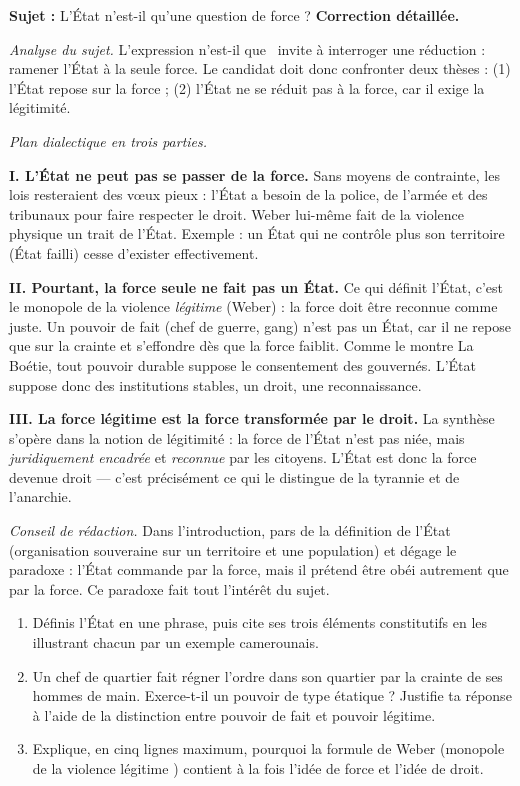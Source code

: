 \documentclass[11pt]{article}
\begin{document}
\begin{exoresolu}
\textbf{Sujet :} L'État n'est-il qu'une question de force ?
\tcblower
\textbf{Correction détaillée.}

\emph{Analyse du sujet.} L'expression \guillemotleft n'est-il que \guillemotright\ invite à interroger une réduction : ramener l'État à la seule force. Le candidat doit donc confronter deux thèses : (1) l'État repose sur la force ; (2) l'État ne se réduit pas à la force, car il exige la légitimité.

\emph{Plan dialectique en trois parties.}

\textbf{I. L'État ne peut pas se passer de la force.} Sans moyens de contrainte, les lois resteraient des vœux pieux : l'État a besoin de la police, de l'armée et des tribunaux pour faire respecter le droit. Weber lui-même fait de la violence physique un trait de l'État. Exemple : un État qui ne contrôle plus son territoire (État failli) cesse d'exister effectivement.

\textbf{II. Pourtant, la force seule ne fait pas un État.} Ce qui définit l'État, c'est le monopole de la violence \emph{légitime} (Weber) : la force doit être reconnue comme juste. Un pouvoir de fait (chef de guerre, gang) n'est pas un État, car il ne repose que sur la crainte et s'effondre dès que la force faiblit. Comme le montre La Boétie, tout pouvoir durable suppose le consentement des gouvernés. L'État suppose donc des institutions stables, un droit, une reconnaissance.

\textbf{III. La force légitime est la force transformée par le droit.} La synthèse s'opère dans la notion de légitimité : la force de l'État n'est pas niée, mais \emph{juridiquement encadrée} et \emph{reconnue} par les citoyens. L'État est donc la force devenue droit — c'est précisément ce qui le distingue de la tyrannie et de l'anarchie.

\emph{Conseil de rédaction.} Dans l'introduction, pars de la définition de l'État (organisation souveraine sur un territoire et une population) et dégage le paradoxe : l'État commande par la force, mais il prétend être obéi autrement que par la force. Ce paradoxe fait tout l'intérêt du sujet.
\end{exoresolu}

\begin{exercice}
\begin{enumerate}
\item Définis l'État en une phrase, puis cite ses trois éléments constitutifs en les illustrant chacun par un exemple camerounais.
\item Un chef de quartier fait régner l'ordre dans son quartier par la crainte de ses hommes de main. Exerce-t-il un pouvoir de type étatique ? Justifie ta réponse à l'aide de la distinction entre pouvoir de fait et pouvoir légitime.
\item Explique, en cinq lignes maximum, pourquoi la formule de Weber (\guillemotleft monopole de la violence légitime \guillemotright) contient à la fois l'idée de force et l'idée de droit.
\end{enumerate}
\end{exercice}
\end{document}
